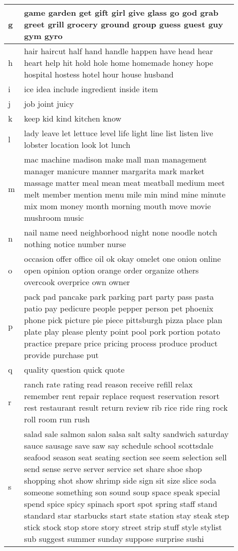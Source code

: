 \documentclass[11pt]{article}
\begin{document}
\begin{table}[ht]
\begin{table}
\begin{tabular}{p{0.05\linewidth}p{0.85\linewidth}}
    \midrule
    g & game garden get gift girl give glass go god grab greet grill grocery ground group guess guest guy gym gyro \\
    \midrule
    h & hair haircut half hand handle happen have head hear heart help hit hold hole home homemade honey hope hospital hostess hotel hour house husband \\
    \midrule
    i & ice idea include ingredient inside item \\
    \midrule
    j & job joint juicy \\
    \midrule
    k & keep kid kind kitchen know \\
    \midrule
    l & lady leave let lettuce level life light line list listen live lobster location look lot lunch \\
    \midrule
    m & mac machine madison make mall man management manager manicure manner margarita mark market massage matter meal mean meat meatball medium meet melt member mention menu mile min mind mine minute mix mom money month morning mouth move movie mushroom music \\
    \midrule
    n & nail name need neighborhood night none noodle notch nothing notice number nurse \\
    \midrule
    o & occasion offer office oil ok okay omelet one onion online open opinion option orange order organize others overcook overprice own owner \\
    \midrule
    p & pack pad pancake park parking part party pass pasta patio pay pedicure people pepper person pet phoenix phone pick picture pie piece pittsburgh pizza place plan plate play please plenty point pool pork portion potato practice prepare price pricing process produce product provide purchase put \\
    \midrule
    q & quality question quick quote \\
    \midrule
    r & ranch rate rating read reason receive refill relax remember rent repair replace request reservation resort rest restaurant result return review rib rice ride ring rock roll room run rush \\
    \midrule
    s & salad sale salmon salon salsa salt salty sandwich saturday sauce sausage save saw say schedule school scottsdale seafood season seat seating section see seem selection sell send sense serve server service set share shoe shop shopping shot show shrimp side sign sit size slice soda someone something son sound soup space speak special spend spice spicy spinach sport spot spring staff stand standard star starbucks start state station stay steak step stick stock stop store story street strip stuff style stylist sub suggest summer sunday suppose surprise sushi \\

\end{tabular}
\end{table}
\end{table}
\end{document}
